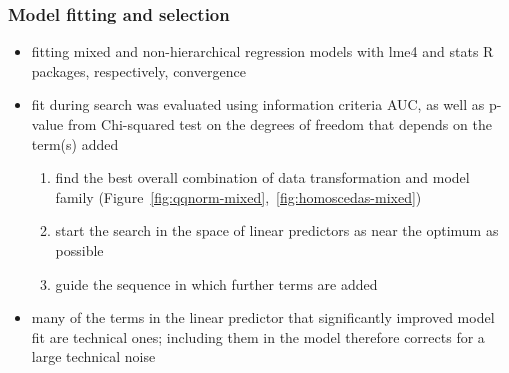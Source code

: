 \documentclass[letterpaper]{article}
\begin{document}

\subsubsection{Model fitting and selection}
\label{sec:fitting}

\begin{itemize}
\item fitting mixed and non-hierarchical regression models with lme4 and stats
R packages, respectively, convergence
\item fit during search was evaluated using information criteria AUC, as well as
p-value from Chi-squared test on the degrees of freedom that depends on the
term(s) added
\begin{enumerate}
\item find the best overall combination of data transformation and model
family (Figure~\ref{fig:qqnorm-mixed},~\ref{fig:homoscedas-mixed})
\item start the search in the space of linear predictors as near the optimum as possible
\item guide the sequence in which further terms are added
\end{enumerate}
\item many of the terms in the linear predictor that significantly improved model fit are technical ones; including them in the model therefore corrects for a large technical noise
\end{itemize}
\end{document}
